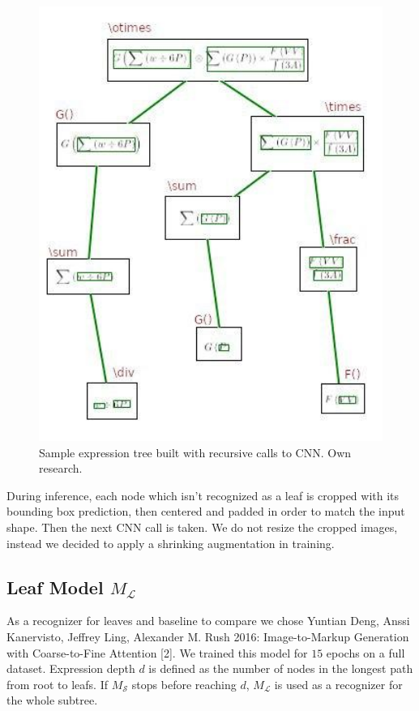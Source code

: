 \documentclass{sciposter}
\begin{document}
\begin{multicols}{3}
\begin{figure}[h]
\begin{center}
\includegraphics[width=16cm]{cnn.jpg}
\end{center}
\caption{ \label{fig:tree} Sample expression tree built with recursive calls to CNN. Own research.}
\end{figure}

During inference, each node which isn't recognized as a leaf is cropped with its bounding box prediction, then centered and padded in order to match the input shape. Then the next CNN call is taken. We do not resize the cropped images, instead we decided to apply a shrinking augmentation in training.

\subsection{Leaf Model $M_{\mathcal{L}}$}
As a recognizer for leaves and baseline to compare we chose Yuntian Deng, Anssi Kanervisto, Jeffrey Ling, Alexander M. Rush 2016: Image-to-Markup Generation with Coarse-to-Fine Attention [2]. We trained this model for $15$ epochs on a full dataset. Expression depth $d$ is defined as the number of nodes in the longest path from root to leafs. If $M_{\mathcal{S}}$ stops before reaching $d$, $M_{\mathcal{L}}$ is used as a recognizer for the whole subtree.


\end{multicols}
\end{document}
